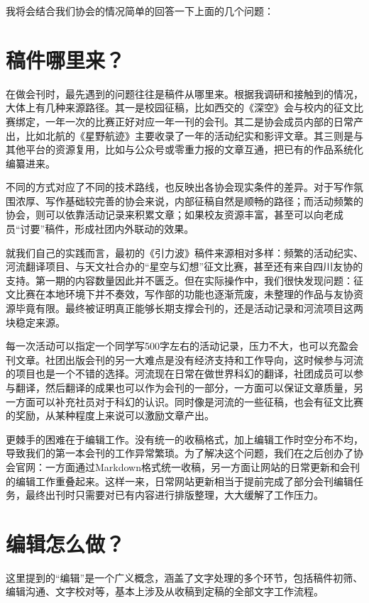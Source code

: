 我将会结合我们协会的情况简单的回答一下上面的几个问题：

\section{稿件哪里来？}\label{ux7a3fux4ef6ux54eaux91ccux6765}

在做会刊时，最先遇到的问题往往是稿件从哪里来。根据我调研和接触到的情况，大体上有几种来源路径。其一是校园征稿，比如西交的《深空》会与校内的征文比赛绑定，一年一次的比赛正好对应一年一刊的会刊。其二是协会成员内部的日常产出，比如北航的《星野航迹》主要收录了一年的活动纪实和影评文章。其三则是与其他平台的资源复用，比如与公众号或零重力报的文章互通，把已有的作品系统化编纂进来。

不同的方式对应了不同的技术路线，也反映出各协会现实条件的差异。对于写作氛围浓厚、写作基础较完善的协会来说，内部征稿自然是顺畅的路径；而活动频繁的协会，则可以依靠活动记录来积累文章；如果校友资源丰富，甚至可以向老成员``讨要''稿件，形成社团内外联动的效果。

就我们自己的实践而言，最初的《引力波》稿件来源相对多样：频繁的活动纪实、河流翻译项目、与天文社合办的``星空与幻想''征文比赛，甚至还有来自四川友协的支持。第一期的内容数量因此并不匮乏。但在实际操作中，我们很快发现问题：征文比赛在本地环境下并不奏效，写作部的功能也逐渐荒废，未整理的作品与友协资源毕竟有限。最终被证明真正能够长期支撑会刊的，还是活动记录和河流项目这两块稳定来源。

每一次活动可以指定一个同学写500字左右的活动记录，压力不大，也可以充盈会刊文章。社团出版会刊的另一大难点是没有经济支持和工作导向，这时候参与河流的项目也是一个不错的选择。河流现在日常在做世界科幻的翻译，社团成员可以参与翻译，然后翻译的成果也可以作为会刊的一部分，一方面可以保证文章质量，另一方面可以补充社员对于科幻的认识。同时像是河流的一些征稿，也会有征文比赛的奖励，从某种程度上来说可以激励文章产出。

更棘手的困难在于编辑工作。没有统一的收稿格式，加上编辑工作时空分布不均，导致我们的第一本会刊的工作异常繁琐。为了解决这个问题，我们在之后创办了协会官网：一方面通过Markdown格式统一收稿，另一方面让网站的日常更新和会刊的编辑工作重叠起来。这样一来，日常网站更新相当于提前完成了部分会刊编辑任务，最终出刊时只需要对已有内容进行排版整理，大大缓解了工作压力。

\section{编辑怎么做？}\label{ux7f16ux8f91ux600eux4e48ux505a}

这里提到的``编辑''是一个广义概念，涵盖了文字处理的多个环节，包括稿件初筛、编辑沟通、文字校对等，基本上涉及从收稿到定稿的全部文字工作流程。


